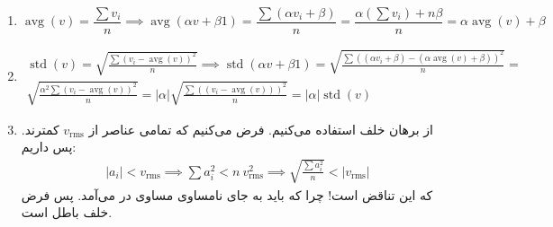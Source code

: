 \\
\begin{enumerate}[wide, labelwidth=!, labelindent=0pt]
\item
\begin{equation*}
\operatorname{avg}(v) = \frac{\sum v_i}{n} \implies
\operatorname{avg}(\alpha v + \beta 1) = \frac{\sum (\alpha v_i + \beta)}{n} = \frac{\alpha(\sum v_i) + n\beta}{n}
= \alpha \operatorname{avg}(v) + \beta
\end{equation*}
\item
\begin{gather*}
\operatorname{std}(v) = \sqrt{\frac{\sum(v_i - \operatorname{avg}(v))^2}{n}} \implies
\operatorname{std}(\alpha v + \beta 1) = \sqrt{\frac{\sum((\alpha v_i + \beta) - (\alpha \operatorname{avg}(v) + \beta))^2}{n}} =\\
\sqrt{\frac{\alpha^2\sum(v_i - \operatorname{avg}(v))^2}{n}} = 
|\alpha|\sqrt{\frac{\sum((v_i - \operatorname{avg}(v)))^2}{n}} = |\alpha|\operatorname{std}(v)
\end{gather*}
\item از برهان خلف استفاده می‌کنیم. فرض می‌کنیم که تمامی عناصر از
$v_{\operatorname{rms}}$
کمترند. پس داریم:
\begin{gather*}
|a_i| < v_{\operatorname{rms}} \implies \sum a_i^2 < n ~ v_{\operatorname{rms}}^2 \implies
\sqrt{\frac{\sum a_i^2}{n}} < |v_{\operatorname{rms}}|
\end{gather*}
که این تناقض است! چرا که باید به جای نامساوی مساوی در می‌آمد. پس فرض خلف باطل است.
\end{enumerate}